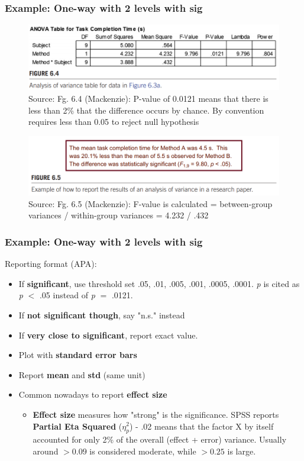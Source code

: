 \documentclass{beamer}
\begin{document}
\begin{frame}
	\frametitle{Example: One-way with 2 levels with sig} 
	\begin{figure}
		\includegraphics[width=0.6\linewidth]{resulta2}
		\caption{Source: Fg. 6.4 (Mackenzie): P-value of 0.0121 means that there is less than 2\% that the difference occurs by chance. By convention requires less than 0.05 to reject null hypothesis}
	\end{figure}
		\begin{figure}
		\includegraphics[width=0.8\linewidth]{resulta3}
		\caption{Source: Fg. 6.5 (Mackenzie): F-value is calculated = between-group variances / within-group variances = 4.232 / .432 }
	\end{figure}
\end{frame}

\begin{frame}
	\frametitle{Example: One-way with 2 levels with sig} 
	Reporting format (APA):
	\begin{itemize}
		\item If \textbf{significant}, use threshold set {.05, .01, .005, .001, .0005, .0001}.  \textit{p} is cited as \textit{p} $<$ .05 instead of \textit{p} $=$ .0121.   
		\item If \textbf{not significant though},  say "n.s." instead
		\item If \textbf{very close to significant}, report exact value.
		\item Plot with \textbf{standard error bars}
		\item Report \textbf{mean} and \textbf{std}  (same unit)
		\item Common nowadays to report\textbf{ effect size}
		\begin{itemize}
			\item  \textbf{Effect size}  measures how "strong" is the significance.  SPSS reports \textbf{Partial Eta Squared} ($\eta_{p}^{2}$) - .02 means that the factor X by itself accounted for only 2\% of the overall (effect + error) variance.  Usually around $>0.09$ is considered moderate, while $>0.25$ is large.
		\end{itemize}
	\end{itemize}
\end{frame}
\end{document}
